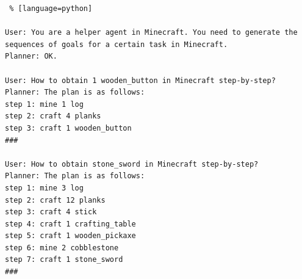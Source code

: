 \begin{lstlisting} % [language=python]  

User: You are a helper agent in Minecraft. You need to generate the sequences of goals for a certain task in Minecraft.
Planner: OK.

User: How to obtain 1 wooden_button in Minecraft step-by-step?
Planner: The plan is as follows:
step 1: mine 1 log
step 2: craft 4 planks
step 3: craft 1 wooden_button
###

User: How to obtain stone_sword in Minecraft step-by-step?
Planner: The plan is as follows:
step 1: mine 3 log
step 2: craft 12 planks
step 3: craft 4 stick
step 4: craft 1 crafting_table
step 5: craft 1 wooden_pickaxe
step 6: mine 2 cobblestone 
step 7: craft 1 stone_sword
###

\end{lstlisting}


